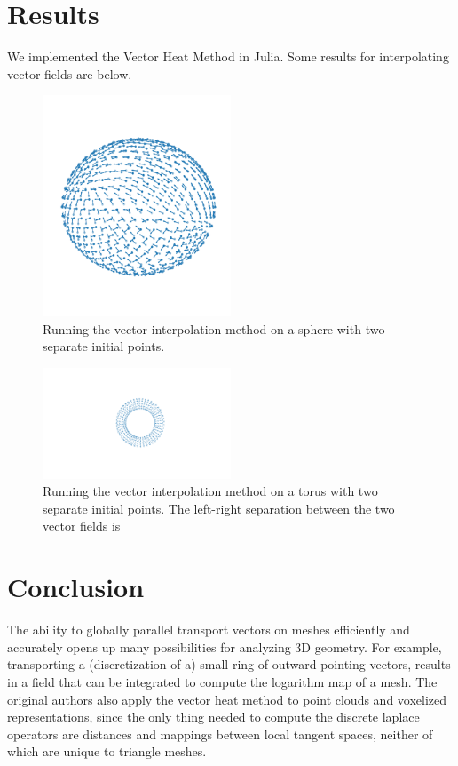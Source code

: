 \documentclass{article}
\begin{document}
\section{Results}
We implemented the Vector Heat Method in Julia. Some results for interpolating
vector fields are below.
\begin{figure}[H]\label{fig:sphere}
  \centering
  \includegraphics[width=0.5\textwidth]{figures/sphere.png}
  \caption{Running the vector interpolation method on a sphere with two separate
  initial points.}
\end{figure}

\begin{figure}[H]\label{fig:torus}
  \centering
  \includegraphics[width=0.5\textwidth]{figures/torus.pdf}
  \caption{Running the vector interpolation method on a torus with two separate
    initial points. The left-right separation between the two vector fields is }
\end{figure}

\section{Conclusion}
The ability to globally parallel transport vectors on meshes efficiently and
accurately opens up many possibilities for analyzing 3D geometry. For example,
transporting a (discretization of a) small ring of outward-pointing vectors,
results in a field that can be integrated to compute the logarithm map of a mesh.
The original authors also apply the vector
heat method to point clouds and voxelized representations, since the only thing
needed to compute the discrete laplace operators are distances and mappings
between local tangent spaces, neither of which are unique to triangle meshes.




\end{document}
